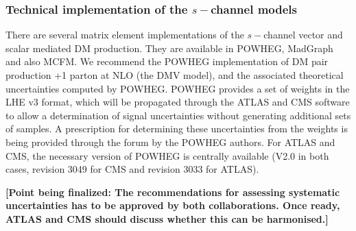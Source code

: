 \documentclass[a4,debug,notitlepage,nobib]{tufte-handout}
\newcommand{\mdm}{\ensuremath{m_{DM}}\xspace}
\newcommand{\mmed}{\ensuremath{m_{med}}\xspace}
\begin{document}

\subsubsection{Technical implementation of the $s-$channel models} 

There are several matrix element implementations of the $s-$channel
vector and scalar mediated DM production.
They are available in POWHEG, MadGraph
and also MCFM. 
We recommend the POWHEG implementation of DM pair production +1 parton at NLO (the DMV model), 
and the associated theoretical uncertainties 
computed by POWHEG. 
POWHEG provides a set
of weights in the LHE v3 format, which will be propagated through the
ATLAS and CMS software to allow a determination of signal uncertainties
without generating additional sets of samples. A prescription for
determining these uncertainties from the weights is being provided
through the forum by the POWHEG authors.
For ATLAS and CMS, the necessary version of POWHEG is centrally available 
(V2.0 in both cases, revision 3049 for CMS and revision 3033 for ATLAS).

\textbf{[Point being finalized: The recommendations for assessing systematic uncertainties has to be approved by 
both collaborations. Once ready, ATLAS and CMS should discuss whether this can be harmonised.]}
\end{document}
